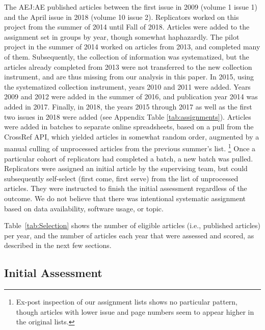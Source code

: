 The \ac{AEJ:AE} published  articles between the first issue in 2009 (volume 1 issue 1) and the April issue in 2018 (volume 10 issue 2). Replicators worked on this project from the summer of 2014 until Fall of 2018. Articles were added to the assignment set in groups by year, though somewhat haphazardly. The pilot project in the summer of 2014 worked on articles from 2013, and completed many of them. Subsequently, the collection of information was systematized, but the articles already completed from 2013 were not transferred to the new collection instrument, and are thus missing from our analysis in this paper. In 2015, using the systematized collection instrument,  years 2010 and 2011 were added. Years 2009 and 2012 were added in the summer of 2016, and publication year 2014 was added in 2017. Finally, in 2018, the years 2015 through 2017 as well as the first two issues in 2018 were added (see Appendix Table \ref{tab:assignments}). Articles were added in batches to separate online spreadsheets, based on a pull from the CrossRef API, which yielded articles in somewhat random order, augmented by a manual culling of unprocessed articles from the previous summer's list.%
%
\footnote{Ex-post inspection of our assignment lists shows no particular pattern, though articles with lower issue and page numbers seem to appear higher in the original lists.}
% 
Once a particular cohort of replicators had completed a batch, a new batch was pulled. 
%
Replicators were assigned an initial article by the supervising team, but could subsequently self-select (first come, first serve) from the list of unprocessed articles. They were instructed to finish the initial assessment regardless of the outcome. We do not believe that there was intentional systematic assignment based on data availability, software usage, or topic.


Table~\ref{tab:Selection} shows the number of eligible articles (i.e., published articles) per year, and the number of articles each year that were assessed and scored, as described in the next few sections. 



\subsection{Initial Assessment}\label{sec:entry}


